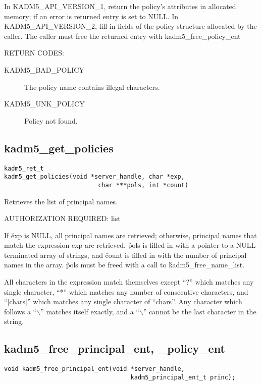 In KADM5_API_VERSION_1, return the policy's attributes in allocated
memory; if an error is returned entry is set to NULL.  In
KADM5_API_VERSION_2, fill in fields of the policy structure allocated
by the caller.  The caller must free the returned entry with
kadm5_free_policy_ent

RETURN CODES: 

\begin{description}
\item[KADM5_BAD_POLICY] The policy name contains illegal characters.
\item[KADM5_UNK_POLICY] Policy not found.
\end{description}

\subsection{kadm5_get_policies}

\begin{verbatim}
kadm5_ret_t
kadm5_get_policies(void *server_handle, char *exp,
                          char ***pols, int *count)
\end{verbatim}

Retrieves the list of principal names.  

AUTHORIZATION REQUIRED: list

If \v{exp} is NULL, all principal names are retrieved; otherwise,
principal names that match the expression exp are retrieved.  \v{pols}
is filled in with a pointer to a NULL-terminated array of strings, and
\v{count} is filled in with the number of principal names in the
array.  \v{pols} must be freed with a call to
\v{kadm5_free_name_list}.

All characters in the expression match themselves except ``?'' which
matches any single character, ``*'' which matches any number of
consecutive characters, and ``[chars]'' which matches any single
character of ``chars''. Any character which follows a ``$\backslash$''
matches itself exactly, and a ``$\backslash$'' cannot be the last
character in the string.

\subsection{kadm5_free_principal_ent, _policy_ent}

\begin{verbatim}
void kadm5_free_principal_ent(void *server_handle,
                                   kadm5_principal_ent_t princ);
\end{verbatim}


